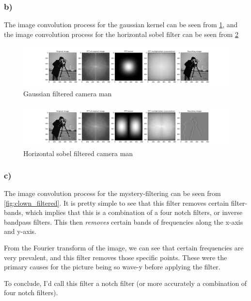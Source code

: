 \subsubsection*{b)}
The image convolution process for the gaussian kernel can be seen from \cref{fig:camera_gaussian}, and the image convolution process for the horizontal sobel filter can be seen from \cref{fig:camera_sobelx}

\begin{figure}[]
    \centering
    \includegraphics[width=1.00\textwidth]{figures/image_processed/camera_gaussian_subplots.png}
    \caption{Gaussian filtered camera man}
    \label{fig:camera_gaussian}
\end{figure}

\begin{figure}[]
    \centering
    \includegraphics[width=1.00\textwidth]{figures/image_processed/camera_sobelx_subplots.png}
    \caption{Horizontal sobel filtered camera man}
    \label{fig:camera_sobelx}
\end{figure}

\subsubsection*{c)}
The image convolution process for the mystery-filtering can be seen from \cref{fig:clown_filtered}. It is pretty simple to see that this filter removes certain filter-bands, which implies that this is a combination of a four notch filters, or inverse bandpass filters. This then \textit{removes} certain bands of frequencies along the x-axis and y-axis. 

From the Fourier transform of the image, we can see that certain frequencies are very prevalent, and this filter removes those specific points. These were the primary causes for the picture being so wave-y before applying the filter. 

To conclude, I'd call this filter a notch filter (or more accurately a combination of four notch filters). 

